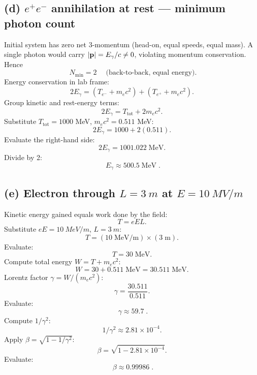 \documentclass[11pt]{article}
\begin{document}
\begin{center}
\end{center}

\subsection*{(d) $e^+e^-$ annihilation at rest --- minimum photon count}

Initial system has zero net 3-momentum (head-on, equal speeds, equal mass). A single photon would carry $|\vb p|=E_\gamma/c\neq 0$, violating momentum conservation. Hence
\[
\boxed{\;N_{\min}=2\;}\quad\text{(back-to-back, equal energy)}.
\]
Energy conservation in lab frame:
\[
2 E_\gamma = (T_{e^-} + m_e c^2) + (T_{e^+} + m_e c^2).
\]
Group kinetic and rest-energy terms:
\[
2 E_\gamma = T_\text{tot} + 2 m_e c^2.
\]
Substitute $T_\text{tot}=1000$ MeV, $m_e c^2 = 0.511$ MeV:
\[
2 E_\gamma = 1000 + 2(0.511).
\]
Evaluate the right-hand side:
\[
2 E_\gamma = 1001.022\;\text{MeV}.
\]
Divide by 2:
\[
\boxed{\;E_\gamma \approx 500.5\;\text{MeV}\;}.
\]

\subsection*{(e) Electron through $L=\SI{3}{m}$ at $E=\SI{10}{MV/m}$}

Kinetic energy gained equals work done by the field:
\[
T = eEL.
\]
Substitute $eE=\SI{10}{MeV/m}$, $L=\SI{3}{m}$:
\[
T = (10\;\text{MeV/m})\times(3\;\text{m}).
\]
Evaluate:
\[
T = 30\;\text{MeV}.
\]
Compute total energy $W = T + m_e c^2$:
\[
W = 30 + 0.511\;\text{MeV} = 30.511\;\text{MeV}.
\]
Lorentz factor $\gamma = W/(m_e c^2)$:
\[
\gamma = \frac{30.511}{0.511}.
\]
Evaluate:
\[
\boxed{\;\gamma \approx 59.7\;}.
\]
Compute $1/\gamma^2$:
\[
1/\gamma^2 \approx 2.81\times 10^{-4}.
\]
Apply $\beta = \sqrt{1 - 1/\gamma^2}$:
\[
\beta = \sqrt{1 - 2.81\times 10^{-4}}.
\]
Evaluate:
\[
\boxed{\;\beta \approx 0.99986\;}.
\]
\end{document}
